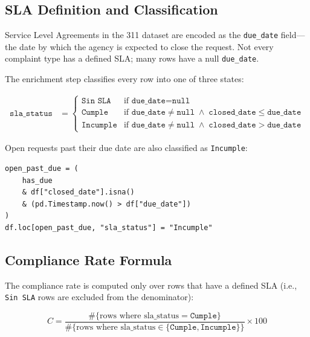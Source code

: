 
\subsection{SLA Definition and Classification}

Service Level Agreements in the 311 dataset are encoded as the \texttt{due\_date} field---the date by which the agency is expected to close the request. Not every complaint type has a defined SLA; many rows have a null \texttt{due\_date}.

The enrichment step classifies every row into one of three states:

\begin{align}
\texttt{sla\_status} &=
\begin{cases}
\texttt{Sin SLA} & \text{if } \texttt{due\_date} = \texttt{null} \\
\texttt{Cumple} & \text{if } \texttt{due\_date} \neq \texttt{null} \;\wedge\; \texttt{closed\_date} \leq \texttt{due\_date} \\
\texttt{Incumple} & \text{if } \texttt{due\_date} \neq \texttt{null} \;\wedge\; \texttt{closed\_date} > \texttt{due\_date}
\end{cases}
\end{align}

Open requests past their due date are also classified as \texttt{Incumple}:

\begin{lstlisting}[style=python, caption={Open-but-past-due classification in \texttt{03\_enrich.py}}, label=lst:sla-open-overdue]
open_past_due = (
    has_due
    & df["closed_date"].isna()
    & (pd.Timestamp.now() > df["due_date"])
)
df.loc[open_past_due, "sla_status"] = "Incumple"
\end{lstlisting}

\subsection{Compliance Rate Formula}

The compliance rate is computed only over rows that have a defined SLA (i.e., \texttt{Sin SLA} rows are excluded from the denominator):

\begin{equation}
C = \frac{\#\{\text{rows where sla\_status} = \texttt{Cumple}\}}{\#\{\text{rows where sla\_status} \in \{\texttt{Cumple}, \texttt{Incumple}\}\}} \times 100
\label{eq:sla-compliance}
\end{equation}

